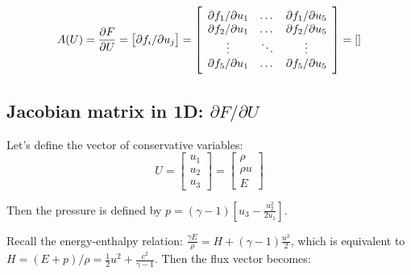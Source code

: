 \documentclass{article}
\begin{document}
\begin{equation}
  A(U)=\frac{\partial F}{\partial U} = \left[ \partial f_i/\partial u_j \right] = \left [
    \begin{array}{c c c}
      \partial f_1/\partial u_1 & \dots & \partial f_1/\partial u_5\\
      \partial f_2/\partial u_1 & \dots & \partial f_2/\partial u_5\\
      \vdots & \ddots & \vdots\\
      \partial f_5/\partial u_1 & \dots & \partial f_5/\partial u_5\\
    \end{array} \right ]
  = \left[
    \begin{array}{c c c c c}
      
    \end{array} \right ]
\end{equation}

\subsection{Jacobian matrix in 1D: \boldmath $\partial F/\partial U$}

Let's define the vector of conservative variables:
\begin{equation}
  U = \left[
    \begin{array}{c}
      u_1\\
      u_2\\
      u_3
    \end{array}
  \right] = \left[
    \begin{array}{c}
      \rho\\
      \rho u\\
      E
    \end{array}
  \right]
\end{equation}

Then the pressure is defined by $p=(\gamma-1)[u_3-\frac{u_2^2}{2u_1} ]$.

Recall the energy-enthalpy relation: $\frac{\gamma E}{\rho} = H+(\gamma-1)\frac{u^2}{2}$, which is equivalent to $H=(E+p)/\rho = \frac{1}{2}u^2+\frac{c^2}{\gamma-1}$. Then the flux vector becomes:
\end{document}
